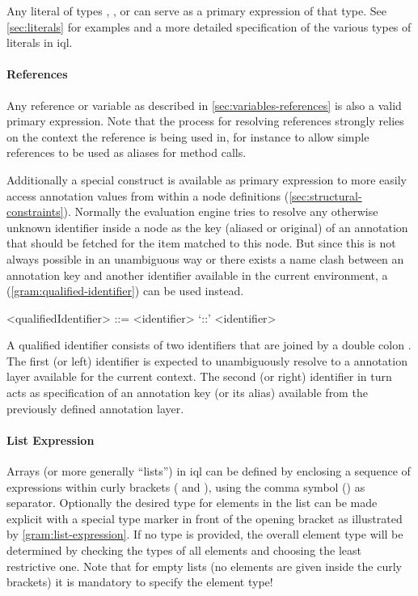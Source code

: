 \documentclass[11pt,a4paper]{article}
\begin{document}
Any literal of types , ,  or  can serve as a primary expression of that type.
See \cref{sec:literals} for examples and a more detailed specification of the various types of literals in \ac{iql}.

\paragraph{References}
\noindent Any reference or variable as described in \cref{sec:variables-references} is also a valid primary expression.
Note that the process for resolving references strongly relies on the context the reference is being used in, for instance to allow simple references to be used as aliases for method calls.

Additionally a special construct is available as primary expression to more easily access annotation values from within a node definitions (\ref{sec:structural-constraints}).
Normally the evaluation engine tries to resolve any otherwise unknown identifier inside a node as the key (aliased or original) of an annotation that should be fetched for the item matched to this node.
But since this is not always possible in an unambiguous way or there exists a name clash between an annotation key and another identifier available in the current environment, a  (\cref{gram:qualified-identifier}) can be used instead.

\begin{gram}
	\label{gram:qualified-identifier}
	\begin{grammar}	
		<qualifiedIdentifier> ::= <identifier> `::' <identifier> 	
	\end{grammar}
\end{gram}

A qualified identifier consists of two identifiers that are joined by a double colon \lit{::}.
The first (or left) identifier is expected to unambiguously resolve to a annotation layer available for the current context.
The second (or right) identifier in turn acts as specification of an annotation key (or its alias) available from the previously defined annotation layer.

\paragraph{List Expression}
Arrays (or more generally ``lists'') in \ac{iql} can be defined by enclosing a sequence of expressions within curly brackets (\lit{\{} and \lit{\}}), using the comma symbol (\lit{,}) as separator.
Optionally the desired type for elements in the list can be made explicit with a special type marker in front of the opening bracket as illustrated by \cref{gram:list-expression}.
If no type is provided, the overall element type will be determined by checking the types of all elements and choosing the least restrictive one.
Note that for empty lists (no elements are given inside the curly brackets) it is mandatory to specify the element type!
\end{document}
